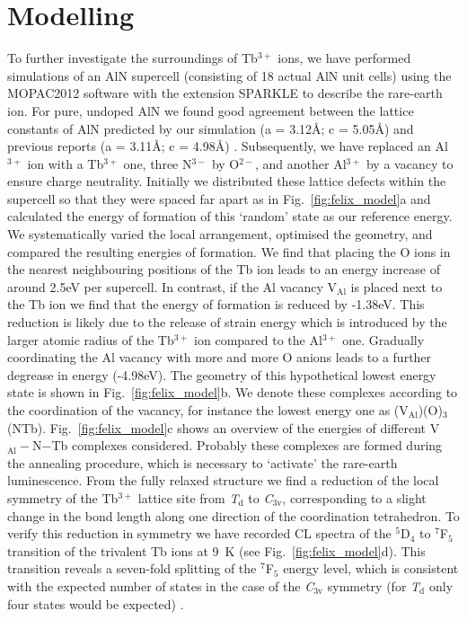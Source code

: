 \documentclass[%
aip,
rsi,%
 amsmath,amssymb,%
 reprint,%
]{revtex4-1}
\begin{document}
\section{Modelling}
\label{sec:model}

To further investigate the surroundings of Tb$^{3+}$ ions, we have performed simulations of an AlN supercell (consisting of 18 actual AlN unit cells) using the MOPAC2012 software \cite{steward12} with the extension SPARKLE \cite{freire10} to describe the rare-earth ion. For pure, undoped AlN we found good agreement between the lattice constants of AlN predicted by our simulation (a = 3.12\AA; c = 5.05\AA) and previous reports (a = 3.11\AA; c = 4.98\AA) \cite{ICDD11}. Subsequently, we have replaced an Al$^{3+}$ ion with a Tb$^{3+}$ one, three N$^{3-}$ by O$^{2-}$, and another Al$^{3+}$ by a vacancy to ensure charge neutrality. Initially we distributed these lattice defects within the supercell so that they were spaced far apart as in Fig.~\ref{fig:felix_model}a and calculated the energy of formation of this \lq{random}\rq{} state as our reference energy. We systematically varied the local arrangement, optimised the geometry, and compared the resulting energies of formation. We find that placing the O ions in the nearest neighbouring positions of the Tb ion leads to an energy increase of around 2.5eV per supercell. In contrast, if the Al vacancy V$_\text{Al}$ is placed next to the Tb ion we find that the energy of formation is reduced by -1.38eV. This reduction is likely due to the release of strain energy which is introduced by the larger atomic radius of the Tb$^{3+}$ ion compared to the Al$^{3+}$ one. Gradually coordinating the Al vacancy with more and more O anions leads to a further degrease in energy (-4.98eV). The geometry of this hypothetical lowest energy state is shown in Fig.~\ref{fig:felix_model}b. We denote these complexes according to the coordination of the vacancy, for instance the lowest energy one as (V$_\text{Al}$)(O)$_3$(NTb). Fig.~\ref{fig:felix_model}c shows an overview of the energies of different V$_\text{Al}-$N$-$Tb complexes considered. Probably these complexes are formed during the annealing procedure, which is necessary to \lq{activate}\rq{} the rare-earth luminescence. From the fully relaxed structure we find a reduction of the local symmetry of the Tb$^{3+}$ lattice site from \textit{T$_\text{d}$} to \textit{C$_\text{3v}$}, corresponding to a slight change in the bond length along one direction of the coordination tetrahedron. To verify this reduction in symmetry we have recorded CL spectra of the $^5$D$_4$ to $^7$F$_5$ transition of the trivalent Tb ions at 9~K (see Fig.~\ref{fig:felix_model}d). This transition reveals a seven-fold splitting of the $^7$F$_5$ energy level, which is consistent with the expected number of states in the case of the \textit{C$_\text{3v}$} symmetry (for \textit{T$_\text{d}$} only four states would be expected) \cite{henderson05}.
\end{document}
